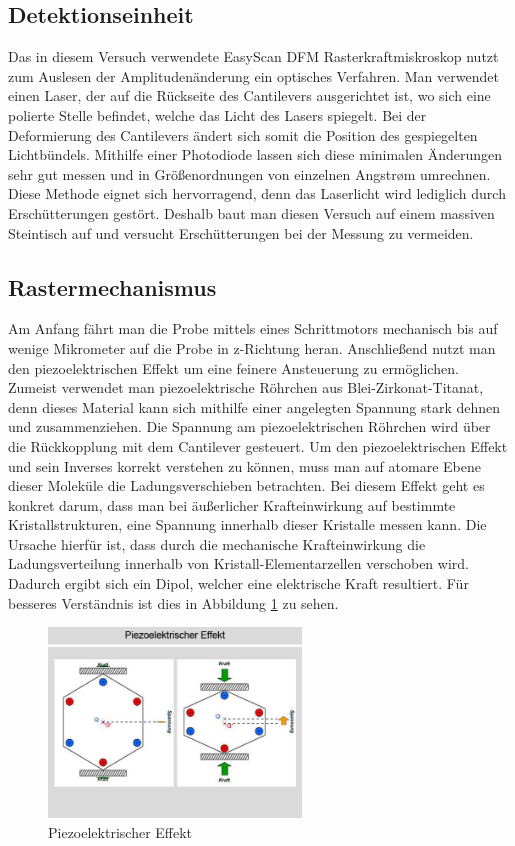  \subsection{Detektionseinheit}
 
 Das in diesem Versuch verwendete EasyScan DFM Rasterkraftmiskroskop nutzt zum Auslesen der Amplitudenänderung ein optisches Verfahren. 
 Man verwendet einen Laser, der auf die Rückseite des Cantilevers ausgerichtet ist, wo sich eine polierte Stelle befindet, welche das Licht des Lasers spiegelt.
 Bei der Deformierung des Cantilevers ändert sich somit die Position des gespiegelten Lichtbündels.
 Mithilfe einer Photodiode lassen sich diese minimalen Änderungen sehr gut messen und in Größenordnungen von einzelnen Angstrøm umrechnen.
 Diese Methode eignet sich hervorragend, denn das Laserlicht wird lediglich durch Erschütterungen gestört.
 Deshalb baut man diesen Versuch auf einem massiven Steintisch auf und versucht Erschütterungen bei der Messung zu vermeiden.

\subsection{Rastermechanismus}

Am Anfang fährt man die Probe mittels eines Schrittmotors mechanisch bis auf wenige Mikrometer auf die Probe in z-Richtung heran.
Anschließend nutzt man den piezoelektrischen Effekt um eine feinere Ansteuerung zu ermöglichen.
Zumeist verwendet man piezoelektrische Röhrchen aus Blei-Zirkonat-Titanat, denn dieses Material kann sich mithilfe einer angelegten Spannung stark dehnen und zusammenziehen. 
Die Spannung am piezoelektrischen Röhrchen wird über die Rückkopplung mit dem Cantilever gesteuert. 
Um den piezoelektrischen Effekt und sein Inverses korrekt verstehen zu können, muss man auf atomare Ebene dieser Moleküle die Ladungsverschieben betrachten.
Bei diesem Effekt geht es konkret darum, dass man bei äußerlicher Krafteinwirkung auf bestimmte Kristallstrukturen, eine Spannung innerhalb dieser Kristalle messen kann.
Die Ursache hierfür ist, dass durch die mechanische Krafteinwirkung die Ladungsverteilung innerhalb von Kristall-Elementarzellen verschoben wird.
Dadurch ergibt sich ein Dipol, welcher eine elektrische Kraft resultiert.
Für besseres Verständnis ist dies in Abbildung \ref{piezo} zu sehen.

\begin{figure}[h!]
    \centering
    \includegraphics[width=0.6\textwidth]{Abb/piezo.jpg}
    \caption{Piezoelektrischer Effekt}
    \label{piezo}
\end{figure}

